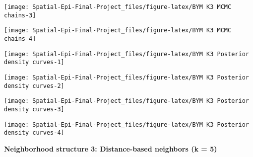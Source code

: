 \documentclass[]{article}
\begin{document}
\begin{center}\texttt{[image: Spatial-Epi-Final-Project\_files/figure-latex/BYM K3 MCMC chains-3]} \end{center}

\begin{center}\texttt{[image: Spatial-Epi-Final-Project\_files/figure-latex/BYM K3 MCMC chains-4]} \end{center}

\begin{center}\texttt{[image: Spatial-Epi-Final-Project\_files/figure-latex/BYM K3 Posterior density curves-1]} \end{center}

\begin{center}\texttt{[image: Spatial-Epi-Final-Project\_files/figure-latex/BYM K3 Posterior density curves-2]} \end{center}

\begin{center}\texttt{[image: Spatial-Epi-Final-Project\_files/figure-latex/BYM K3 Posterior density curves-3]} \end{center}

\begin{center}\texttt{[image: Spatial-Epi-Final-Project\_files/figure-latex/BYM K3 Posterior density curves-4]} \end{center}

\textbf{Neighborhood structure 3: Distance-based neighbors (k = 5)}
\end{document}
